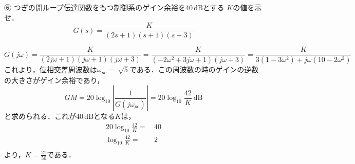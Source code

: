 ⑥ つぎの開ループ伝達関数をもつ制御系のゲイン余裕を$40\,\mathrm{dB}$とする
$K$の値を示せ．
$$
G(s)=\frac{K}{(2s+1)(s+1)(s+3)}
$$


$$
G(j \omega)=\frac{K}{(2 j \omega+1)(j \omega+1)(j \omega+3)}=\frac{K}{\left(-2 \omega^2+3 j \omega+1\right)(j \omega+3)}=\frac{K}{3\left(1-3 \omega^2\right)+j \omega\left(10-2 \omega^2\right)}
$$
これより，位相交差周波数は$\omega_{pc}=\sqrt[]{5}$である．この周波数の時のゲインの逆数の大きさがゲイン余裕であり，
$$
GM=20 \log _{10}\left|\frac{1}{G\left(j \omega_{p c}\right)}\right|=20 \log _{10} \frac{42}{K} \mathrm{~dB}
$$
と求められる．これが$40\,\mathrm{dB}$となる$K$は，
\begin{align*}
    20\log_{10}\frac{42}{K}= & \,40 \\
    \log_{10}\frac{42}{K}= & \,2 \\
\end{align*}
より，$K=\frac{21}{50}$である．
\newpage
